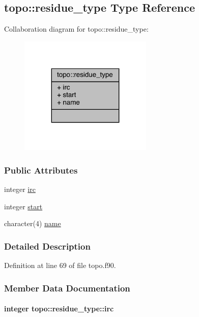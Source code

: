 \hypertarget{structtopo_1_1residue__type}{\subsection{topo\-:\-:residue\-\_\-type Type Reference}
\label{structtopo_1_1residue__type}
}


Collaboration diagram for topo\-:\-:residue\-\_\-type\-:
\nopagebreak
\begin{figure}[H]
\begin{center}
\leavevmode
\includegraphics[width=179pt]{structtopo_1_1residue__type__coll__graph}
\end{center}
\end{figure}
\subsubsection*{Public Attributes}
\begin{DoxyCompactItemize}
\item 
integer \hyperlink{structtopo_1_1residue__type_a9d96e09ae644afed5475d4095f1b65e8}{irc}
\item 
integer \hyperlink{structtopo_1_1residue__type_a09643f047cc32e454c2d717141840380}{start}
\item 
character(4) \hyperlink{structtopo_1_1residue__type_a76f46b255e12ee2ee6655582acf9e2e1}{name}
\end{DoxyCompactItemize}


\subsubsection{Detailed Description}


Definition at line 69 of file topo.\-f90.



\subsubsection{Member Data Documentation}
\hypertarget{structtopo_1_1residue__type_a9d96e09ae644afed5475d4095f1b65e8}{
\paragraph[{irc}]{\setlength{\rightskip}{0pt plus 5cm}integer topo\-::residue\-\_\-type\-::irc}}\label{structtopo_1_1residue__type_a9d96e09ae644afed5475d4095f1b65e8}


